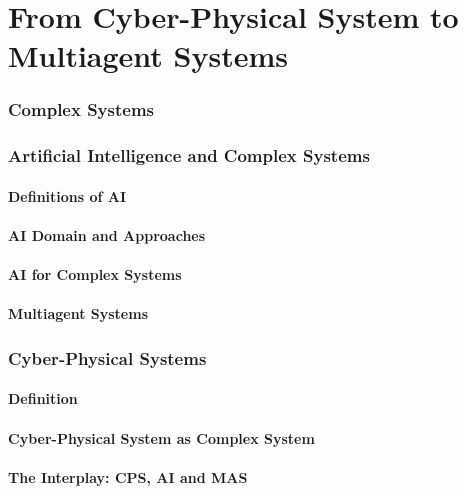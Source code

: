 


\part{From Cyber-Physical System to Multiagent Systems}
\begin{bibliographysection}

	\section{Complex Systems}
	

	\section{Artificial Intelligence and Complex Systems}
	\subsection{Definitions of AI}
	
	
	\subsection{AI Domain and Approaches}
	
	
	\subsection{AI for Complex Systems}
	
	\subsection{Multiagent Systems}
	

	\section{Cyber-Physical Systems}
	\subsection{Definition}
	
	\subsection{Cyber-Physical System as Complex System}
	
	\subsection{The Interplay: CPS, AI and MAS}
	


\end{bibliographysection}
